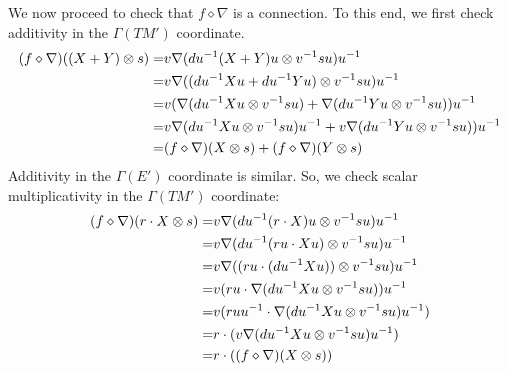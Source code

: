 \documentclass[./Thick_TQFTs_and_Quantum_Information.tex]{subfiles}
\begin{document}
We now proceed to check that $f \diamond \nabla$ is a connection. To this end,
we first check additivity in the $\Gamma(TM')$ coordinate.
\begin{align*}
(f \diamond \nabla)((X + Y) \otimes s)
=& v\nabla(du^{-1}(X + Y)u \otimes v^{-1}su)u^{-1} \\
=& v\nabla((du^{-1}Xu + du^{-1}Yu) \otimes v^{-1}su)u^{-1} \\
=& v(\nabla(du^{-1}Xu \otimes v^{-1}su)
 + \nabla(du^{-1}Yu \otimes v^{-1}su))u^{-1} \\
=& v\nabla(du^{-1}Xu \otimes v^{-1}su)u^{-1}
 + v\nabla(du^{-1}Yu \otimes v^{-1}su))u^{-1} \\
=& (f \diamond \nabla)(X \otimes s) + (f \diamond \nabla)(Y \otimes s)
\end{align*}
Additivity in the $\Gamma(E')$ coordinate is similar. So, we check scalar
multiplicativity in the $\Gamma(TM')$ coordinate:
\begin{align*}
(f \diamond \nabla)(r \cdot X \otimes s)
=& v\nabla(du^{-1}(r \cdot X)u \otimes v^{-1}su)u^{-1} \\
=& v\nabla(du^{-1}(ru \cdot Xu) \otimes v^{-1}su)u^{-1} \\
=& v\nabla((ru \cdot (du^{-1}Xu)) \otimes v^{-1}su)u^{-1} \\
=& v (ru \cdot \nabla(du^{-1}Xu \otimes v^{-1}su))u^{-1} \\
=& v (ruu^{-1} \cdot \nabla(du^{-1}Xu \otimes v^{-1}su)u^{-1}) \\
=& r \cdot (v\nabla(du^{-1}Xu \otimes v^{-1}su)u^{-1}) \\
=& r \cdot ((f \diamond \nabla)(X \otimes s))
\end{align*}
\end{document}
